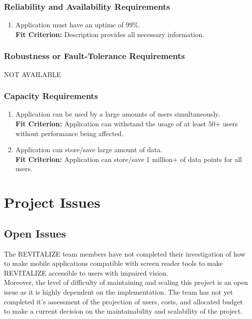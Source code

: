 \documentclass[12pt,letterpaper]{article}
\begin{document}
\subsubsection{Reliability and Availability Requirements}
\begin{enumerate}[resume*] 
\item Application must have an uptime of 99\%.\\
{\textbf{Fit Criterion:} Description provides all necessary information. }
\end{enumerate}

\subsubsection{Robustness or Fault-Tolerance Requirements}
\noindent NOT AVAILABLE

\subsubsection{Capacity Requirements}
\begin{enumerate}[resume*] 
\item Application can be used by a large amounts of users simultaneously.\\
{\textbf{Fit Criterion:} Application can withstand the usage of at least 50+ users without performance being affected. }
\item Application can store/save large amount of data.\\
{\textbf{Fit Criterion:} Application can store/save 1 million+ of data points for all users. }
\end{enumerate}

\section{Project Issues}

\subsection{Open Issues}
The REVITALIZE team members have not completed their investigation of how to make mobile applications compatible with screen reader tools to make REVITALIZE accessible to users with impaired vision.\\

Moreover, the level of difficulty of maintaining and scaling this project is an open issue as it is highly dependent on the implementation. The team has not yet completed it's assessment of the projection of users, costs, and allocated budget to make a current decision on the maintainability and scalability of the project.\\
\end{document}
